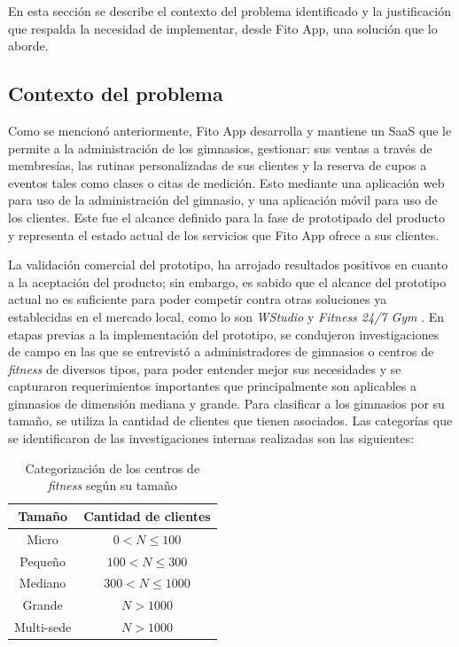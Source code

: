 En esta sección se describe el contexto del problema identificado y la justificación que respalda la necesidad de implementar, desde Fito App, una solución que lo aborde.

\subsection{Contexto del problema}

Como se mencionó anteriormente, Fito App desarrolla y mantiene un SaaS que le permite a la administración de los gimnasios, gestionar: sus ventas a través de membresías, las rutinas personalizadas de sus clientes y la reserva de cupos a eventos tales como clases o citas de medición. Esto mediante una aplicación web para uso de la administración del gimnasio,  y una aplicación móvil para uso de los clientes. Este fue el alcance definido para la fase de prototipado del producto y representa el estado actual de los servicios que Fito App ofrece a sus clientes.

La validación comercial del prototipo, ha arrojado resultados positivos en cuanto a la aceptación del producto; sin embargo, es sabido que el alcance del prototipo actual no es suficiente para poder competir contra otras soluciones ya establecidas en el mercado local, como lo son \textit{WStudio} \cite{wstudio} y \textit{Fitness 24/7 Gym} \cite{latinsoft}. En etapas previas a la implementación del prototipo, se condujeron investigaciones de campo en las que se entrevistó a administradores de gimnasios o centros de \textit{fitness} de diversos tipos, para poder entender mejor sus necesidades y se capturaron requerimientos importantes que principalmente son aplicables a gimnasios de dimensión mediana y grande. Para clasificar a los gimnasios por su tamaño, se utiliza la cantidad de clientes que tienen asociados. Las categorías que se identificaron de las investigaciones internas realizadas son las siguientes:

 
 \begin{table}[h!]
     \centering
     \begin{tabular}{c|c}
     \hline
          \textbf{Tamaño} & \textbf{Cantidad de clientes}\\
          \hline
          Micro & $0 < N \leq 100$\\
          Pequeño & $100 < N \leq 300$\\
          Mediano & $300 < N \leq 1000$\\
          Grande & $N > 1000$ \\
          Multi-sede &  $N > 1000$\\
          \hline
     \end{tabular}
     \caption{Categorización de los centros de \textit{fitness} según su tamaño}
     \label{tab:sizes}
 \end{table}


